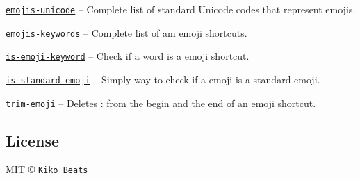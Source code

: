 \begin{DoxyItemize}
\item \href{https://github.com/Kikobeats/emojis-unicode}{\tt emojis-\/unicode} – Complete list of standard Unicode codes that represent emojis.
\item \href{https://github.com/Kikobeats/emojis-keywords}{\tt emojis-\/keywords} – Complete list of am emoji shortcuts.
\item \href{https://github.com/Kikobeats/is-emoji-keyword}{\tt is-\/emoji-\/keyword} – Check if a word is a emoji shortcut.
\item \href{https://github.com/kikobeats/is-standard-emoji}{\tt is-\/standard-\/emoji} – Simply way to check if a emoji is a standard emoji.
\item \href{https://github.com/Kikobeats/trim-emoji}{\tt trim-\/emoji} – Deletes \textquotesingle{}\+:\textquotesingle{} from the begin and the end of an emoji shortcut.
\end{DoxyItemize}

\subsection*{License}

M\+IT © \href{http://www.kikobeats.com}{\tt Kiko Beats} 